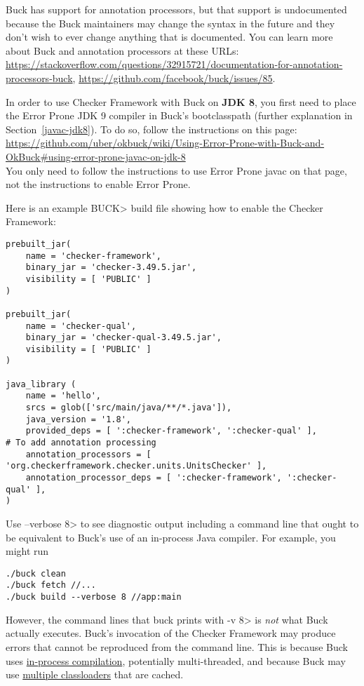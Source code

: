 Buck has support for annotation processors, but that support is
undocumented because the Buck maintainers may change the syntax in the
future and they don't wish to ever change anything that is documented.
You can learn more about Buck and annotation processors at these URLs:
{\codesize\url{https://stackoverflow.com/questions/32915721/documentation-for-annotation-processors-buck}},
{\codesize\url{https://github.com/facebook/buck/issues/85}}.

In order to use Checker Framework with Buck on \textbf{JDK 8}, you first need
to place the Error Prone JDK 9 compiler in Buck's bootclasspath
(further explanation in Section~\ref{javac-jdk8}).  To do so,
follow the instructions on this page: \\
{\codesize\url{https://github.com/uber/okbuck/wiki/Using-Error-Prone-with-Buck-and-OkBuck#using-error-prone-javac-on-jdk-8}} \\
You only need to follow the instructions to use Error Prone javac on
that page, not the instructions to enable Error Prone.

Here is an example \<BUCK> build
file showing how to enable the Checker Framework:

\begin{Verbatim}
prebuilt_jar(
    name = 'checker-framework',
    binary_jar = 'checker-3.49.5.jar',
    visibility = [ 'PUBLIC' ]
)

prebuilt_jar(
    name = 'checker-qual',
    binary_jar = 'checker-qual-3.49.5.jar',
    visibility = [ 'PUBLIC' ]
)

java_library (
    name = 'hello',
    srcs = glob(['src/main/java/**/*.java']),
    java_version = '1.8',
    provided_deps = [ ':checker-framework', ':checker-qual' ],
# To add annotation processing
    annotation_processors = [ 'org.checkerframework.checker.units.UnitsChecker' ],
    annotation_processor_deps = [ ':checker-framework', ':checker-qual' ],
)
\end{Verbatim}



Use \<--verbose 8> to see diagnostic output including a command line that
ought to be equivalent to Buck's use of an in-process Java compiler.
For example, you might run

\begin{Verbatim}
./buck clean
./buck fetch //...
./buck build --verbose 8 //app:main
\end{Verbatim}

However, the command lines that buck prints with \<-v 8> is \emph{not} what
Buck actually executes.  Buck's invocation of the Checker Framework may
produce errors that cannot be reproduced from the command line.  This is
because Buck uses
\href{https://github.com/facebook/buck/blob/main/src/com/facebook/buck/jvm/java/Jsr199Javac.java}{in-process
  compilation}, potentially multi-threaded, and because Buck may use
\href{https://github.com/facebook/buck/blob/main/src/com/facebook/buck/util/ClassLoaderCache.java}{multiple
  classloaders} that are cached.

